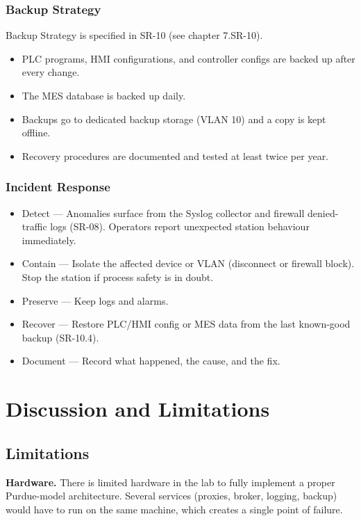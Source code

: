 \documentclass[11pt,a4paper]{article}
\begin{document}
\subsubsection{Backup Strategy}
Backup Strategy is specified in SR-10 (see chapter 7.SR-10).

\begin{itemize}
    \item PLC programs, HMI configurations, and controller configs are backed up after every change.
    \item The MES database is backed up daily.
    \item Backups go to dedicated backup storage (VLAN 10) and a copy is kept offline.
    \item Recovery procedures are documented and tested at least twice per year.
\end{itemize}

\subsubsection{Incident Response}
\begin{itemize}
    \item Detect — Anomalies surface from the Syslog collector and firewall denied-traffic logs (SR-08). Operators report unexpected station behaviour immediately.
    \item Contain — Isolate the affected device or VLAN (disconnect or firewall block). Stop the station if process safety is in doubt.
    \item Preserve — Keep logs and alarms.
    \item Recover — Restore PLC/HMI config or MES data from the last known-good backup (SR-10.4).
    \item Document — Record what happened, the cause, and the fix. 
\end{itemize}

\pagebreak
\section{Discussion and Limitations}
\subsection{Limitations}

\textbf{Hardware.} There is limited hardware in the lab to fully implement a
proper Purdue-model architecture. Several services (proxies, broker, logging,
backup) would have to run on the same machine, which creates a single point of
failure.
\end{document}
